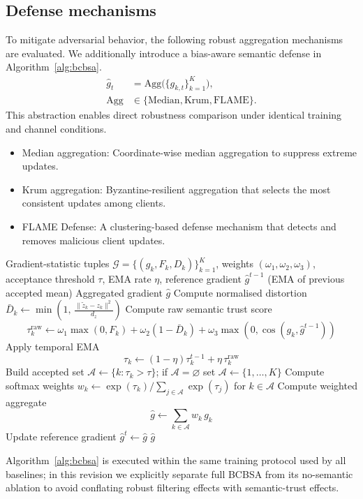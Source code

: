 \documentclass[10pt,journal]{IEEEtran}
\begin{document}
\subsection{Defense mechanisms}
To mitigate adversarial behavior, the following robust aggregation mechanisms are evaluated\cite{blanchard2017krum,yin2018byzantine,nguyen2022flame}. We additionally introduce a bias-aware semantic defense in Algorithm~\ref{alg:bcbsa}.
\begin{equation}
\begin{aligned}
\hat{g}_t &= \mathrm{Agg}\big(\{g_{k,t}\}_{k=1}^{K}\big), \\
\mathrm{Agg} &\in\{\mathrm{Median},\mathrm{Krum},\mathrm{FLAME}\}.
\end{aligned}
\end{equation}
This abstraction enables direct robustness comparison under identical training and channel conditions.
\begin{itemize}
\item Median aggregation: Coordinate-wise median aggregation to suppress extreme updates\cite{yin2018byzantine}.
\item Krum aggregation: Byzantine-resilient aggregation that selects the most consistent updates among clients\cite{blanchard2017krum}.
\item FLAME Defense: A clustering-based defense mechanism that detects and removes malicious client updates\cite{nguyen2022flame}.
\end{itemize}
\begin{algorithm}[t]
\caption{Proposed Bias-Compensated Byzantine Semantic Aggregation (BCBSA)}
\label{alg:bcbsa}
\begin{algorithmic}[1]
\REQUIRE Gradient-statistic tuples $\mathcal{G}=\{(g_k,F_k,D_k)\}_{k=1}^{K}$, weights $(\omega_1,\omega_2,\omega_3)$, acceptance threshold $\tau$, EMA rate $\eta$, reference gradient $\hat{g}^{t-1}$ (EMA of previous accepted mean)
\ENSURE Aggregated gradient $\hat{g}$
\STATE Compute normalised distortion $\bar{D}_k \leftarrow \min\!\left(1,\,\frac{\|\tilde{z}_k-z_k\|^2}{d_z}\right)$
\STATE Compute raw semantic trust score\[\tau_k^{\mathrm{raw}} \leftarrow \omega_1\max(0,F_k) + \omega_2(1-\bar{D}_k) + \omega_3\max\!\left(0,\cos(g_k,\hat{g}^{t-1})\right)\]
\STATE Apply temporal EMA\[\tau_k \leftarrow (1-\eta)\tau_k^{t-1} + \eta\,\tau_k^{\mathrm{raw}}\]
\ENDFOR
\STATE Build accepted set $\mathcal{A} \leftarrow \{k : \tau_k > \tau\}$; if $\mathcal{A}=\varnothing$ set $\mathcal{A}\leftarrow\{1,\ldots,K\}$
\STATE Compute softmax weights $w_k \leftarrow \exp(\tau_k)/\sum_{j\in\mathcal{A}}\exp(\tau_j)$ for $k\in\mathcal{A}$
\STATE Compute weighted aggregate\[\hat{g} \leftarrow \sum_{k\in\mathcal{A}} w_k\, g_k\]
\STATE Update reference gradient $\hat{g}^t \leftarrow \hat{g}$
\RETURN $\hat{g}$
\end{algorithmic}
\end{algorithm}
Algorithm~\ref{alg:bcbsa} is executed within the same training protocol used by all baselines; in this revision we explicitly separate full BCBSA from its no-semantic ablation to avoid conflating robust filtering effects with semantic-trust effects.
\end{document}
